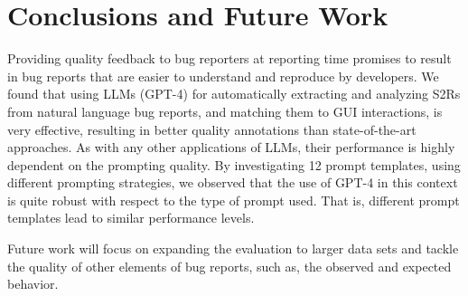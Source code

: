 
\section{Conclusions and Future Work}
\label{sec:conclusions}

Providing quality feedback to bug reporters at reporting time promises to result in bug reports that are easier to understand and reproduce by developers.  
We found that using LLMs (\ie GPT-4) for automatically extracting and analyzing S2Rs from natural language bug reports, and matching them to GUI interactions, is very effective, resulting in better quality annotations than state-of-the-art approaches.
As with any other applications of LLMs, their performance is highly dependent on the prompting quality.
By investigating 12 prompt templates, using different prompting strategies, we observed that the use of GPT-4 in this context is quite robust with respect to the type of prompt used.
That is, different prompt templates lead to similar performance levels.

Future work will focus on expanding the evaluation to larger data sets and tackle the quality of other elements of bug reports, such as, the observed and expected behavior. 
